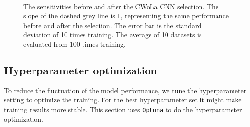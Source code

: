 \documentclass[12pt]{article}
\begin{document}
        \begin{figure}[htpb]
            \centering
             \\
            \caption{The sensitivities before and after the CWoLa CNN selection. The slope of the dashed grey line is $1$, representing the same performance before and after the selection. The error bar is the standard deviation of 10 times training. The average of 10 datasets is evaluated from 100 times training.}
            \label{fig:sensitivity_improvement_jet_aug_3_random_res_25}
        \end{figure}
    \subsection{Hyperparameter optimization}%
    \label{sub:hyperparameter_optimization}
        To reduce the fluctuation of the model performance, we tune the hyperparameter setting to optimize the training. For the best hyperparameter set it might make training results more stable. This section uses \verb|Optuna| to do the hyperparameter optimization.
\end{document}

